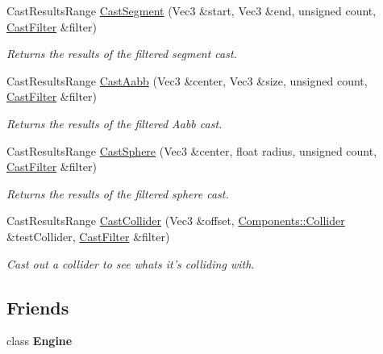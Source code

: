 \begin{DoxyCompactItemize}
Cast\-Results\-Range \hyperlink{classDCEngine_1_1Systems_1_1Physics_a7ec37a2458485c7fbdf727db7b075e94}{Cast\-Segment} (Vec3 \&start, Vec3 \&end, unsigned count, \hyperlink{structDCEngine_1_1CastFilter}{Cast\-Filter} \&filter)
\begin{DoxyCompactList}\small\item\em Returns the results of the filtered segment cast. \end{DoxyCompactList}\item 
Cast\-Results\-Range \hyperlink{classDCEngine_1_1Systems_1_1Physics_afb1520219f87fc75feb74f24031a5e26}{Cast\-Aabb} (Vec3 \&center, Vec3 \&size, unsigned count, \hyperlink{structDCEngine_1_1CastFilter}{Cast\-Filter} \&filter)
\begin{DoxyCompactList}\small\item\em Returns the results of the filtered Aabb cast. \end{DoxyCompactList}\item 
Cast\-Results\-Range \hyperlink{classDCEngine_1_1Systems_1_1Physics_af47dc05f13852672453541f6ccf7a6e5}{Cast\-Sphere} (Vec3 \&center, float radius, unsigned count, \hyperlink{structDCEngine_1_1CastFilter}{Cast\-Filter} \&filter)
\begin{DoxyCompactList}\small\item\em Returns the results of the filtered sphere cast. \end{DoxyCompactList}\item 
Cast\-Results\-Range \hyperlink{classDCEngine_1_1Systems_1_1Physics_a0c0a655d338e25d5c4c120b368f26452}{Cast\-Collider} (Vec3 \&offset, \hyperlink{classDCEngine_1_1Components_1_1Collider}{Components\-::\-Collider} \&test\-Collider, \hyperlink{structDCEngine_1_1CastFilter}{Cast\-Filter} \&filter)
\begin{DoxyCompactList}\small\item\em Cast out a collider to see whats it's colliding with. \end{DoxyCompactList}\end{DoxyCompactItemize}
\subsection*{Friends}
\begin{DoxyCompactItemize}
\item 
\hypertarget{classDCEngine_1_1Systems_1_1Physics_a3e1914489e4bed4f9f23cdeab34a43dc}{class {\bfseries Engine}}\label{classDCEngine_1_1Systems_1_1Physics_a3e1914489e4bed4f9f23cdeab34a43dc}

\end{DoxyCompactItemize}
